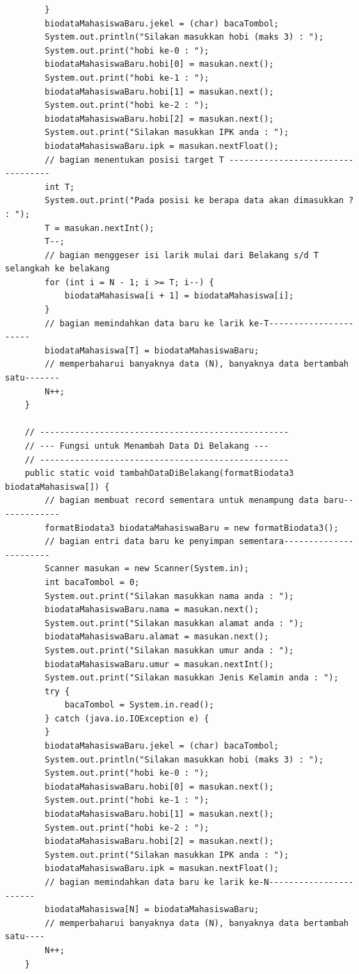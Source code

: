 \documentclass[a4paper,12pt]{article}
\begin{document}
\begin{lstlisting}
        }
        biodataMahasiswaBaru.jekel = (char) bacaTombol;
        System.out.println("Silakan masukkan hobi (maks 3) : ");
        System.out.print("hobi ke-0 : ");
        biodataMahasiswaBaru.hobi[0] = masukan.next();
        System.out.print("hobi ke-1 : ");
        biodataMahasiswaBaru.hobi[1] = masukan.next();
        System.out.print("hobi ke-2 : ");
        biodataMahasiswaBaru.hobi[2] = masukan.next();
        System.out.print("Silakan masukkan IPK anda : ");
        biodataMahasiswaBaru.ipk = masukan.nextFloat();
        // bagian menentukan posisi target T ----------------------------------
        int T;
        System.out.print("Pada posisi ke berapa data akan dimasukkan ? : ");
        T = masukan.nextInt();
        T--;
        // bagian menggeser isi larik mulai dari Belakang s/d T selangkah ke belakang
        for (int i = N - 1; i >= T; i--) {
            biodataMahasiswa[i + 1] = biodataMahasiswa[i];
        }
        // bagian memindahkan data baru ke larik ke-T----------------------
        biodataMahasiswa[T] = biodataMahasiswaBaru;
        // memperbaharui banyaknya data (N), banyaknya data bertambah satu-------
        N++;
    }

    // --------------------------------------------------
    // --- Fungsi untuk Menambah Data Di Belakang ---
    // --------------------------------------------------
    public static void tambahDataDiBelakang(formatBiodata3 biodataMahasiswa[]) {
        // bagian membuat record sementara untuk menampung data baru-------------
        formatBiodata3 biodataMahasiswaBaru = new formatBiodata3();
        // bagian entri data baru ke penyimpan sementara-----------------------
        Scanner masukan = new Scanner(System.in);
        int bacaTombol = 0;
        System.out.print("Silakan masukkan nama anda : ");
        biodataMahasiswaBaru.nama = masukan.next();
        System.out.print("Silakan masukkan alamat anda : ");
        biodataMahasiswaBaru.alamat = masukan.next();
        System.out.print("Silakan masukkan umur anda : ");
        biodataMahasiswaBaru.umur = masukan.nextInt();
        System.out.print("Silakan masukkan Jenis Kelamin anda : ");
        try {
            bacaTombol = System.in.read();
        } catch (java.io.IOException e) {
        }
        biodataMahasiswaBaru.jekel = (char) bacaTombol;
        System.out.println("Silakan masukkan hobi (maks 3) : ");
        System.out.print("hobi ke-0 : ");
        biodataMahasiswaBaru.hobi[0] = masukan.next();
        System.out.print("hobi ke-1 : ");
        biodataMahasiswaBaru.hobi[1] = masukan.next();
        System.out.print("hobi ke-2 : ");
        biodataMahasiswaBaru.hobi[2] = masukan.next();
        System.out.print("Silakan masukkan IPK anda : ");
        biodataMahasiswaBaru.ipk = masukan.nextFloat();
        // bagian memindahkan data baru ke larik ke-N-----------------------
        biodataMahasiswa[N] = biodataMahasiswaBaru;
        // memperbaharui banyaknya data (N), banyaknya data bertambah satu----
        N++;
    }


\end{lstlisting}
\end{document}
